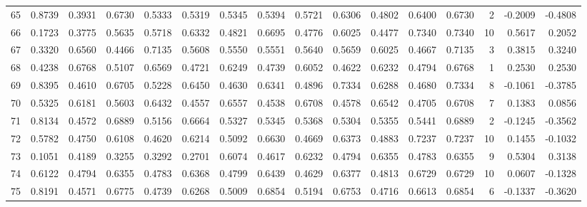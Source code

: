 \begin{tabular}{lrrrrrrrrrrrrrrr}
65  &      0.8739 &  0.3931 &  0.6730 &  0.5333 &  0.5319 &  0.5345 &  0.5394 &  0.5721 &  0.6306 &  0.4802 &   0.6400 &     0.6730 &      2 &                   -0.2009 &                    -0.4808 \\
66  &      0.1723 &  0.3775 &  0.5635 &  0.5718 &  0.6332 &  0.4821 &  0.6695 &  0.4776 &  0.6025 &  0.4477 &   0.7340 &     0.7340 &     10 &                    0.5617 &                     0.2052 \\
67  &      0.3320 &  0.6560 &  0.4466 &  0.7135 &  0.5608 &  0.5550 &  0.5551 &  0.5640 &  0.5659 &  0.6025 &   0.4667 &     0.7135 &      3 &                    0.3815 &                     0.3240 \\
68  &      0.4238 &  0.6768 &  0.5107 &  0.6569 &  0.4721 &  0.6249 &  0.4739 &  0.6052 &  0.4622 &  0.6232 &   0.4794 &     0.6768 &      1 &                    0.2530 &                     0.2530 \\
69  &      0.8395 &  0.4610 &  0.6705 &  0.5228 &  0.6450 &  0.4630 &  0.6341 &  0.4896 &  0.7334 &  0.6288 &   0.4680 &     0.7334 &      8 &                   -0.1061 &                    -0.3785 \\
70  &      0.5325 &  0.6181 &  0.5603 &  0.6432 &  0.4557 &  0.6557 &  0.4538 &  0.6708 &  0.4578 &  0.6542 &   0.4705 &     0.6708 &      7 &                    0.1383 &                     0.0856 \\
71  &      0.8134 &  0.4572 &  0.6889 &  0.5156 &  0.6664 &  0.5327 &  0.5345 &  0.5368 &  0.5304 &  0.5355 &   0.5441 &     0.6889 &      2 &                   -0.1245 &                    -0.3562 \\
72  &      0.5782 &  0.4750 &  0.6108 &  0.4620 &  0.6214 &  0.5092 &  0.6630 &  0.4669 &  0.6373 &  0.4883 &   0.7237 &     0.7237 &     10 &                    0.1455 &                    -0.1032 \\
73  &      0.1051 &  0.4189 &  0.3255 &  0.3292 &  0.2701 &  0.6074 &  0.4617 &  0.6232 &  0.4794 &  0.6355 &   0.4783 &     0.6355 &      9 &                    0.5304 &                     0.3138 \\
74  &      0.6122 &  0.4794 &  0.6355 &  0.4783 &  0.6368 &  0.4799 &  0.6439 &  0.4629 &  0.6377 &  0.4813 &   0.6729 &     0.6729 &     10 &                    0.0607 &                    -0.1328 \\
75  &      0.8191 &  0.4571 &  0.6775 &  0.4739 &  0.6268 &  0.5009 &  0.6854 &  0.5194 &  0.6753 &  0.4716 &   0.6613 &     0.6854 &      6 &                   -0.1337 &                    -0.3620 \\

\end{tabular}
